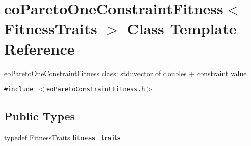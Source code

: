 \section{eo\-Pareto\-One\-Constraint\-Fitness$<$ Fitness\-Traits $>$ Class Template Reference}
\label{classeo_pareto_one_constraint_fitness}
eo\-Pareto\-One\-Constraint\-Fitness class: std::vector of doubles + constraint value  


{\tt \#include $<$eo\-Pareto\-Constraint\-Fitness.h$>$}

\subsection*{Public Types}
\begin{CompactItemize}
\item 
typedef Fitness\-Traits {\bf fitness\_\-traits}\label{classeo_pareto_one_constraint_fitness_w0}

\end{CompactItemize}
